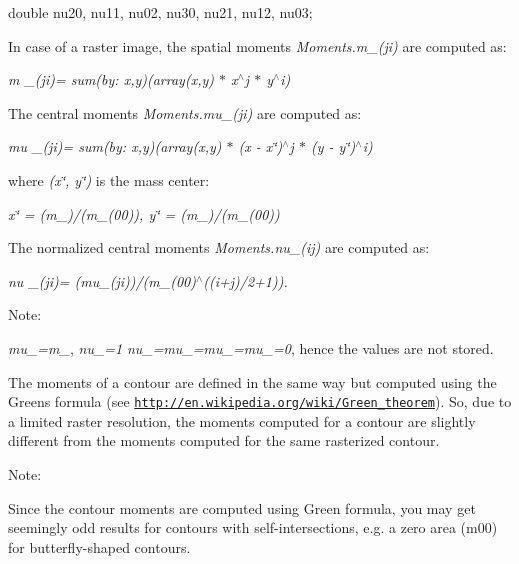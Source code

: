 {\ttfamily }

{\ttfamily }

{\ttfamily double nu20, nu11, nu02, nu30, nu21, nu12, nu03;}

{\ttfamily }

{\ttfamily }

{\ttfamily In case of a raster image, the spatial moments {\itshape Moments.\+m\+\_\+(ji)} are computed as\+: }

{\itshape m \+\_\+(ji)= sum(by\+: x,y)(array(x,y) $\ast$ x$^\wedge$j $\ast$ y$^\wedge$i)}

The central moments {\itshape Moments.\+mu\+\_\+(ji)} are computed as\+:

{\itshape mu \+\_\+(ji)= sum(by\+: x,y)(array(x,y) $\ast$ (x -\/ x\char`\"{})$^\wedge$j $\ast$ (y -\/ y\char`\"{})$^\wedge$i)}

where {\itshape (x\char`\"{}, y\char`\"{})} is the mass center\+:

{\itshape x\char`\"{} = (m\+\_)/(m\+\_\+(00)), y\char`\"{} = (m\+\_)/(m\+\_\+(00))}

The normalized central moments {\itshape Moments.\+nu\+\_\+(ij)} are computed as\+:

{\itshape nu \+\_\+(ji)= (mu\+\_\+(ji))/(m\+\_\+(00)$^\wedge$((i+j)/2+1)).}

Note\+:

{\itshape mu\+\_=m\+\_}, {\itshape nu\+\_=1} {\itshape nu\+\_=mu\+\_=mu\+\_=mu\+\_=0}, hence the values are not stored.

The moments of a contour are defined in the same way but computed using the Green\textquotesingle{}s formula (see \href{http://en.wikipedia.org/wiki/Green_theorem}{\tt http\+://en.\+wikipedia.\+org/wiki/\+Green\+\_\+theorem}). So, due to a limited raster resolution, the moments computed for a contour are slightly different from the moments computed for the same rasterized contour.

Note\+:

Since the contour moments are computed using Green formula, you may get seemingly odd results for contours with self-\/intersections, e.\+g. a zero area ({\ttfamily m00}) for butterfly-\/shaped contours.


